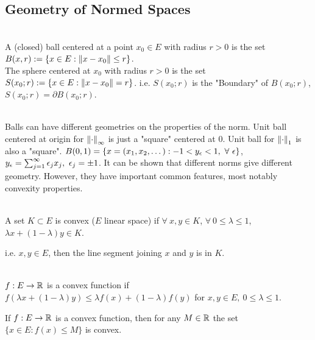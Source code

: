 \vspace{6pt}
\subsection{Geometry of Normed Spaces}
\begin{definition}\ \\
A (closed) ball centered at a point $x_0 \in E$ with radius $r > 0$ is the set $B(x,r) := \{x \in E: \norm{x - x_0} \leq r\}$.\\ The sphere centered at $x_0$ with radius $r > 0$ is the set $S(x_0; r) := \{ x \in E: \norm{x - x_0} = r\}$. i.e. $S(x_0;r)$ is the "Boundary" of $B(x_0; r)$, $S(x_0;r) = \partial B(x_0;r)$. 
\end{definition}

\begin{remark}\ \\
Balls can have different geometries on the properties of the norm. Unit ball centered at origin for $\norm{\cdot}_\infty$ is just a "square" centered at $0$. Unit ball for $\norm{\cdot}_1$ is also a "square". $B(0,1) = \{x = (x_1,x_2,\dots): -1 < y_\epsilon < 1,\ \forall\ \epsilon\}$, $y_\epsilon = \sum_{j = 1}^\infty \epsilon_j x_j,\ \epsilon_j = \pm 1$. It can be shown that different norms give different geometry.
However, they have important common features, most notably convexity properties.
\end{remark}

\begin{definition}\ \\
A set $K \subset E$ is convex ($E$ linear space) if $\forall\ x,y \in K$, $\forall\ 0 \leq \lambda \leq 1$, $\lambda x + (1 - \lambda) y \in K$.
\end{definition}
\begin{remark}
i.e. $x,y \in E$, then the line segment joining $x$ and $y$ is in $K$.
\end{remark}

\begin{definition}\ \\
$f: E \to \mathbb{R}$ is a convex function if $f(\lambda x + (1 - \lambda)y) \leq \lambda f(x) + (1 - \lambda) f(y)$ for $x,y \in E,\ 0 \leq \lambda \leq 1$.
\end{definition}
\begin{remark}
If $f: E \to \mathbb{R}$ is a convex function, then for any $M \in \mathbb{R}$ the set $\{x \in E: f(x) \leq M\}$ is convex.
\end{remark}

